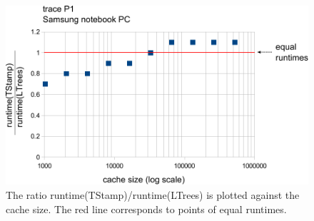\documentclass[a4paper,12pt, titlepage]{article}  %
\begin{document}
\begin{figure}[p]
	\centering
	\includegraphics[scale=0.8]{./experiments/samsung_P1.pdf}
	\caption{The ratio runtime(TStamp)/runtime(LTrees) is plotted against the cache size.
                     The red line corresponds to points of equal runtimes.} 
	\label{fig:samsung_P1}
\end{figure}
\end{document}
